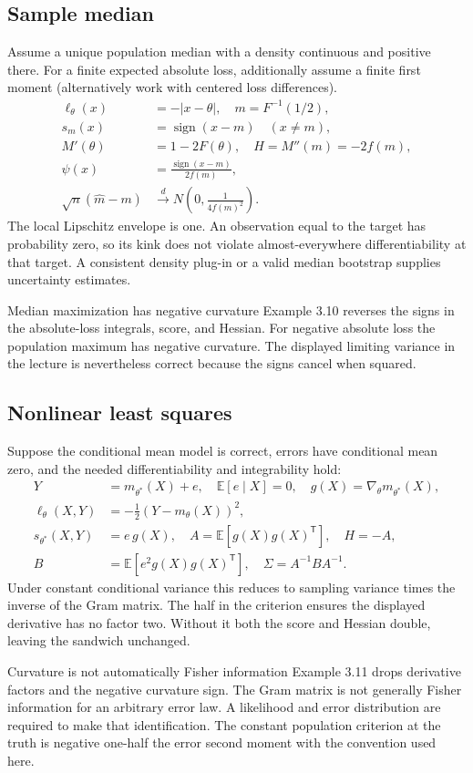 \documentclass[12pt]{article}
\newcommand{\E}{\mathbb E}
\begin{document}
\subsection{Sample median}
Assume a unique population median with a density continuous and positive
there. For a finite expected absolute loss, additionally assume a finite
first moment (alternatively work with centered loss differences).
\begin{align}
 \ell_\theta(x)&=-|x-\theta|,\quad m=F^{-1}(1/2),\\
 s_m(x)&=\operatorname{sign}(x-m)\quad(x\ne m),\\
 M'(\theta)&=1-2F(\theta),\quad H=M''(m)=-2f(m),\\
 \psi(x)&=\frac{\operatorname{sign}(x-m)}{2f(m)},\\
 \sqrt n(\widehat m-m)&\xrightarrow{d}
 N\left(0,\frac1{4f(m)^2}\right).
\end{align}
The local Lipschitz envelope is one. An observation equal to the target
has probability zero, so its kink does not violate almost-everywhere
differentiability at that target. A consistent density plug-in or a valid
median bootstrap supplies uncertainty estimates.
\begin{correctionbox}{Median maximization has negative curvature}
Example 3.10 reverses the signs in the absolute-loss integrals, score,
and Hessian. For negative absolute loss the population maximum has
negative curvature. The displayed limiting variance in the lecture is
nevertheless correct because the signs cancel when squared.
\end{correctionbox}

\subsection{Nonlinear least squares}
Suppose the conditional mean model is correct, errors have conditional
mean zero, and the needed differentiability and integrability hold:
\begin{align}
 Y&=m_{\theta^*}(X)+e,\quad \E[e\mid X]=0,\quad
 g(X)=\nabla_\theta m_{\theta^*}(X),\\
 \ell_\theta(X,Y)&=-\tfrac12(Y-m_\theta(X))^2,\\
 s_{\theta^*}(X,Y)&=e\,g(X),\quad
 A=\E[g(X)g(X)^{\mathsf T}],\quad H=-A,\\
 B&=\E[e^2g(X)g(X)^{\mathsf T}],\quad
 \Sigma=A^{-1}BA^{-1}.
\end{align}
Under constant conditional variance this reduces to sampling variance
times the inverse of the Gram matrix. The half in the criterion ensures
the displayed derivative has no factor two. Without it both the score
and Hessian double, leaving the sandwich unchanged.
\begin{correctionbox}{Curvature is not automatically Fisher information}
Example 3.11 drops derivative factors and the negative curvature sign.
The Gram matrix is not generally Fisher information for an arbitrary
error law. A likelihood and error distribution are required to make that
identification. The constant population criterion at the truth is negative
one-half the error second moment with the convention used here.
\end{correctionbox}
\end{document}
